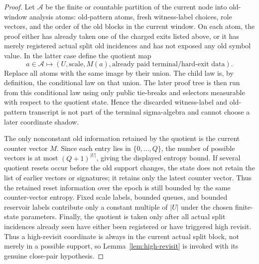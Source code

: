 \documentclass[11pt]{article}
\begin{document}
\begin{proof}
Let $\mathcal A$ be the finite or countable partition of the current node into
old-window analysis atoms: old-pattern atoms, fresh witness-label choices, role
vectors, and the order of the old blocks in the current window.  On each atom,
the proof either has already taken one of the charged exits listed above, or it
has merely registered actual split old incidences and has not exposed any old
symbol value.  In the latter case define the quotient map
\[
  a\in\mathcal A
  \longmapsto
  (U,\mathrm{scale},M(a),\text{already paid terminal/hard-exit data}).
\]
Replace all atoms with the same image by their union.  The child law is, by
definition, the conditional law on that union.  The later proof tree is then
run from this conditional law using only public tie-breaks and selectors
measurable with respect to the quotient state.  Hence the discarded
witness-label and old-pattern transcript is not part of the terminal
sigma-algebra and cannot choose a later coordinate shadow.

The only nonconstant old information retained by the quotient is the current
counter vector $M$.  Since each entry lies in $\{0,\ldots,Q\}$, the number of
possible vectors is at most $(Q+1)^{|U|}$, giving the displayed entropy bound.
If several quotient resets occur before the old support changes, the state does
not retain the list of earlier vectors or signatures; it retains only the
latest counter vector.  Thus the retained reset information over the epoch is
still bounded by the same counter-vector entropy.  Fixed scale labels, bounded
queues, and bounded reservoir labels contribute only a constant multiple of
$|U|$ under the chosen finite-state parameters.  Finally, the quotient is taken
only after all actual split incidences already seen have either been registered
or have triggered high revisit.  Thus a high-revisit coordinate is always in
the current actual split block, not merely in a possible support, so
Lemma~\ref{lem:high-revisit} is invoked with its genuine close-pair hypothesis.
\end{proof}
\end{document}
